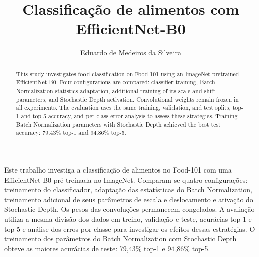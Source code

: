 \documentclass[12pt]{article}
\title{Classificação de alimentos com EfficientNet-B0}
\author{Eduardo de Medeiros da Silveira\inst{1}}
\begin{document}
\maketitle

\begin{abstract}
  This study investigates food classification on Food-101 using an
  ImageNet-pretrained EfficientNet-B0. Four configurations are compared:
  classifier training, Batch Normalization statistics adaptation, additional
  training of its scale and shift parameters, and Stochastic Depth activation.
  Convolutional weights remain frozen in all experiments. The evaluation uses
  the same training, validation, and test splits, top-1 and top-5 accuracy,
  and per-class error analysis
  to assess these strategies. Training Batch Normalization parameters with
  Stochastic Depth achieved the best test accuracy: 79.43\% top-1 and
  94.86\% top-5.
\end{abstract}

\begin{resumo}
  Este trabalho investiga a classificação de alimentos no Food-101 com uma
  EfficientNet-B0 pré-treinada no ImageNet. Comparam-se quatro configurações:
  treinamento do classificador, adaptação das estatísticas do Batch
  Normalization, treinamento adicional de seus parâmetros de escala e
  deslocamento e ativação do Stochastic Depth. Os pesos das convoluções
  permanecem congelados. A avaliação utiliza a mesma divisão dos dados em
  treino, validação e teste,
  acurácias top-1 e top-5 e análise dos erros por classe para investigar os
  efeitos dessas estratégias. O treinamento dos parâmetros do Batch
  Normalization com Stochastic Depth obteve as maiores acurácias de teste:
  79,43\% top-1 e 94,86\% top-5.
\end{resumo}












\end{document}

